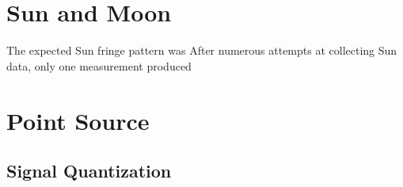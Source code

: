 \documentclass[12pt]{article}
\begin{document}
\section{Sun and Moon}
The expected Sun fringe pattern was 
After numerous attempts at collecting Sun data, only one measurement produced 


\section{Point Source}

\subsection{Signal Quantization}

%

\enddocument
\end{document}
